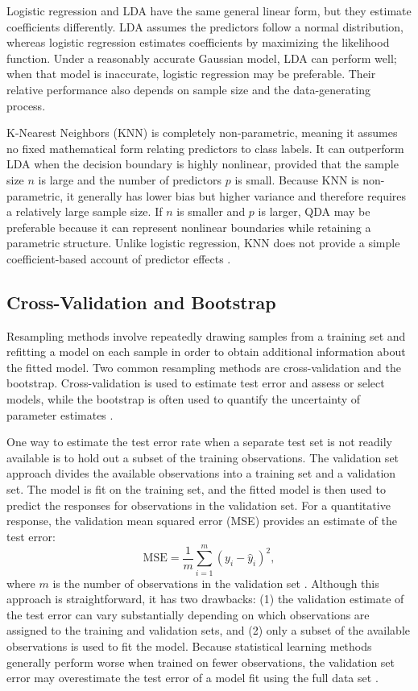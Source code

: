 \documentclass[11pt,letterpaper,reqno]{amsart}
\numberwithin{equation}{subsection}
\theoremstyle{definition}
\numberwithin{thm}{subsection}
\begin{document}
Logistic regression and LDA have the same general linear form, but they estimate coefficients differently. LDA assumes the predictors follow a normal distribution, whereas logistic regression estimates coefficients by maximizing the likelihood function. Under a reasonably accurate Gaussian model, LDA can perform well; when that model is inaccurate, logistic regression may be preferable. Their relative performance also depends on sample size and the data-generating process.

K-Nearest Neighbors (KNN) is completely non-parametric, meaning it assumes no fixed mathematical form relating predictors to class labels. It can outperform LDA when the decision boundary is highly nonlinear, provided that the sample size $n$ is large and the number of predictors $p$ is small. Because KNN is non-parametric, it generally has lower bias but higher variance and therefore requires a relatively large sample size. If $n$ is smaller and $p$ is larger, QDA may be preferable because it can represent nonlinear boundaries while retaining a parametric structure. Unlike logistic regression, KNN does not provide a simple coefficient-based account of predictor effects \cite[Section 4.5.1, p. 163]{James:2023}.

\subsection{Cross-Validation and Bootstrap}

Resampling methods involve repeatedly drawing samples from a training set and refitting a model on each sample in order to obtain additional information about the fitted model. Two common resampling methods are cross-validation and the bootstrap. Cross-validation is used to estimate test error and assess or select models, while the bootstrap is often used to quantify the uncertainty of parameter estimates \cite[Ch. 5, p. 201]{James:2023}.

One way to estimate the test error rate when a separate test set is not readily available is to hold out a subset of the training observations. The validation set approach divides the available observations into a training set and a validation set. The model is fit on the training set, and the fitted model is then used to predict the responses for observations in the validation set. For a quantitative response, the validation mean squared error (MSE) provides an estimate of the test error:
\[
\mathrm{MSE} = \frac{1}{m}\sum_{i=1}^{m}(y_i-\hat{y}_i)^2,
\]
where $m$ is the number of observations in the validation set \cite[Equation 2.5, p. 28]{James:2023}. Although this approach is straightforward, it has two drawbacks: (1) the validation estimate of the test error can vary substantially depending on which observations are assigned to the training and validation sets, and (2) only a subset of the available observations is used to fit the model. Because statistical learning methods generally perform worse when trained on fewer observations, the validation set error may overestimate the test error of a model fit using the full data set \cite[Section 5.1.1, pp. 202--204]{James:2023}.
\end{document}
